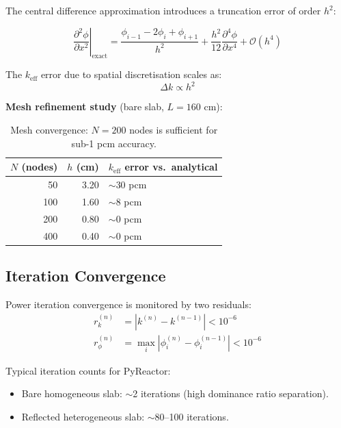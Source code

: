 \documentclass[12pt,a4paper]{article}
\newcommand{\keff}{k_{\mathrm{eff}}}
\newcommand{\pdd}[2]{\frac{\partial^2 #1}{\partial #2^2}}
\begin{document}
The central difference approximation introduces a truncation error
of order $h^2$:

\begin{equation}
  \left.\pdd{\phi}{x}\right|_{\text{exact}}
  = \frac{\phi_{i-1} - 2\phi_i + \phi_{i+1}}{h^2}
  + \frac{h^2}{12}\frac{\partial^4\phi}{\partial x^4} + \mathcal{O}(h^4)
\end{equation}

The $\keff$ error due to spatial discretisation scales as:
\begin{equation}
  \Delta k \propto h^2
\end{equation}

\textbf{Mesh refinement study} (bare slab, $L = 160$ cm):

\begin{table}[h!]
\centering
\begin{tabular}{rrl}
\toprule
$N$ (nodes) & $h$ (cm) & $\keff$ error vs.\ analytical \\
\midrule
 50  & 3.20 & $\sim$30 pcm \\
100  & 1.60 & $\sim$8 pcm \\
200  & 0.80 & $\sim$0 pcm \\
400  & 0.40 & $\sim$0 pcm \\
\bottomrule
\end{tabular}
\caption{Mesh convergence: $N = 200$ nodes is sufficient for sub-1 pcm accuracy.}
\end{table}

\subsection{Iteration Convergence}

Power iteration convergence is monitored by two residuals:
\begin{align}
  r_k^{(n)}   &= |k^{(n)} - k^{(n-1)}| < 10^{-6} \\
  r_\phi^{(n)} &= \max_i|\phi_i^{(n)} - \phi_i^{(n-1)}| < 10^{-6}
\end{align}

Typical iteration counts for PyReactor:
\begin{itemize}
  \item Bare homogeneous slab: $\sim$2 iterations (high dominance ratio separation).
  \item Reflected heterogeneous slab: $\sim$80--100 iterations.
\end{itemize}

\end{document}
